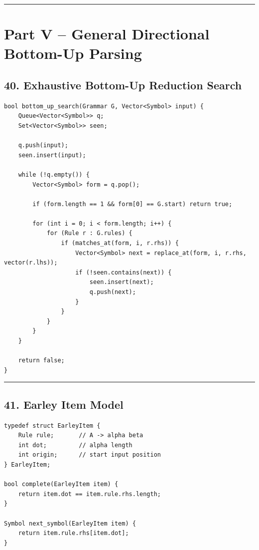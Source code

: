 \documentclass[10pt,letterpaper]{article}
\begin{document}
\medskip\hrule\medskip

\clearpage
\section*{Part V -- General Directional Bottom-Up Parsing}

\subsection*{40. Exhaustive Bottom-Up Reduction Search}

\begin{verbatim}
bool bottom_up_search(Grammar G, Vector<Symbol> input) {
    Queue<Vector<Symbol>> q;
    Set<Vector<Symbol>> seen;

    q.push(input);
    seen.insert(input);

    while (!q.empty()) {
        Vector<Symbol> form = q.pop();

        if (form.length == 1 && form[0] == G.start) return true;

        for (int i = 0; i < form.length; i++) {
            for (Rule r : G.rules) {
                if (matches_at(form, i, r.rhs)) {
                    Vector<Symbol> next = replace_at(form, i, r.rhs, vector(r.lhs));
                    if (!seen.contains(next)) {
                        seen.insert(next);
                        q.push(next);
                    }
                }
            }
        }
    }

    return false;
}
\end{verbatim}

\medskip\hrule\medskip

\subsection*{41. Earley Item Model}

\begin{verbatim}
typedef struct EarleyItem {
    Rule rule;       // A -> alpha beta
    int dot;         // alpha length
    int origin;      // start input position
} EarleyItem;

bool complete(EarleyItem item) {
    return item.dot == item.rule.rhs.length;
}

Symbol next_symbol(EarleyItem item) {
    return item.rule.rhs[item.dot];
}
\end{verbatim}
\end{document}
